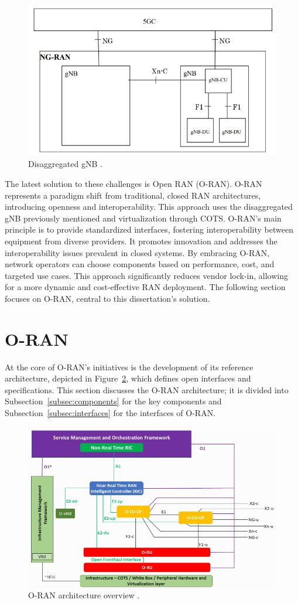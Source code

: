 \begin{figure}[H]
    \centering
    \includegraphics[width=0.6\linewidth]{figures/gnb_diss}
    \caption[Disaggregated gNB]{Disaggregated gNB \cite{gnb_diss}.}
    \label{fig:gnbdiss}
\end{figure}

The latest solution to these challenges is Open RAN (O-RAN). O-RAN represents a paradigm shift from traditional, closed RAN architectures, introducing openness and interoperability.
This approach uses the disaggregated gNB previously mentioned and virtualization through COTS. O-RAN's main principle is to provide standardized interfaces, fostering interoperability between equipment from diverse providers.
It promotes innovation and addresses the interoperability issues prevalent in closed systems.
By embracing O-RAN, network operators can choose components based on performance, cost, and targeted use cases.
This approach significantly reduces vendor lock-in, allowing for a more dynamic and cost-effective RAN deployment.
The following section focuses on O-RAN, central to this dissertation's solution.


\section{O-RAN}\label{sec:ORAN}
At the core of O-RAN's initiatives is the development of its reference architecture, depicted in Figure~\ref{fig:ORAN}, which defines open interfaces and specifications.
This section discusses the O-RAN architecture; it is divided into   Subsection~\ref{subsec:components} for the key components and Subsection~\ref{subsec:interfaces} for the interfaces of O-RAN\@.
 
\begin{figure}[H]
    \centering
    \includegraphics[width=0.6\linewidth]{figures/ORAN}
    \caption[O-RAN architecture overview]{O-RAN architecture overview \cite{ORAN-ARCH}.}
    \label{fig:ORAN}
\end{figure}


